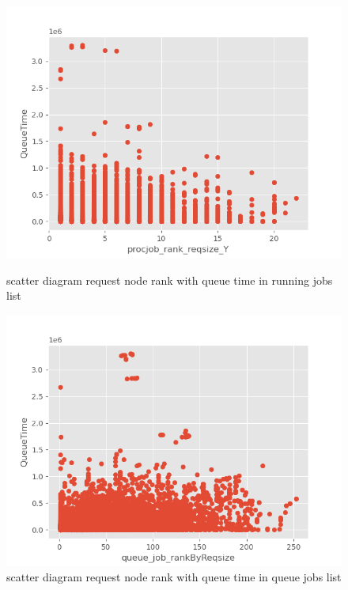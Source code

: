 \documentclass[conference,compsoc]{IEEEtran}
\begin{document}
\begin{figure}[htbp]
	\begin{minipage}[t]{0.45\linewidth}
		\includegraphics[width=\linewidth]{runningjobrank.png} 
		\caption{scatter diagram request node rank with queue time in running jobs list} 
		\label{Fig:4}
	\end{minipage}%
	\hfill%
	\begin{minipage}[t]{0.45\linewidth}
		\includegraphics[width=\linewidth]{rankreqsize.png}
		\caption{scatter diagram request node rank with queue time in queue jobs list}
		\label{Fig:5}
	\end{minipage} 
\end{figure}
\end{document}
